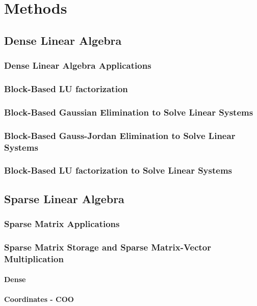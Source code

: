 \chapter{Methods}
\graphicspath{{chapters/methods/}}

\section{Dense Linear Algebra}
\subsection{Dense Linear Algebra Applications}
\subsection{Block-Based LU factorization}
\subsection{Block-Based Gaussian Elimination to Solve Linear Systems}
\subsection{Block-Based Gauss-Jordan Elimination to Solve Linear Systems}
\subsection{Block-Based LU factorization to Solve Linear Systems}


\section{Sparse Linear Algebra}

\subsection{Sparse Matrix Applications}
\subsection{Sparse Matrix Storage and Sparse Matrix-Vector Multiplication}

\subsubsection{Dense}
\subsubsection{Coordinates - COO}
